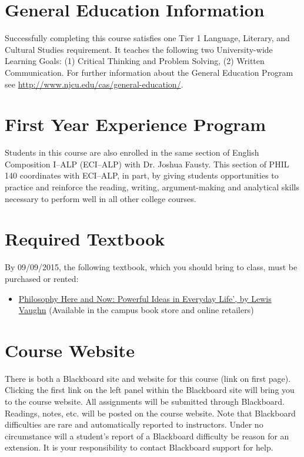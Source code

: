 \documentclass[article,oneside]{memoir}
\begin{document}
\section{General Education Information} 
Successfully completing this course satisfies one Tier 1 Language, Literary, and Cultural Studies requirement. It teaches the following two University-wide Learning Goals: (1) Critical Thinking and Problem Solving, (2) Written Communication. For further information about the General Education Program see \href{http://www.njcu.edu/cas/general-education/}{http://www.njcu.edu/cas/general-education/}.
 \section{First Year Experience Program}
Students in this course are also enrolled in the same section of English Composition I--ALP (ECI--ALP) with Dr. Joshua Fausty.  This section of PHIL 140 coordinates with ECI--ALP, in part, by giving students opportunities to practice and reinforce the reading, writing, argument-making and analytical skills necessary to perform well in all other college courses. 


\section{Required Textbook}

By 09/09/2015, the following textbook,  which you should bring to class, must be purchased or rented:

\begin{itemize}
\item
  \href{http://www.amazon.com/Philosophy-Here-Now-Powerful-Everyday/dp/0199765227}{Philosophy
  Here and Now: Powerful Ideas in Everyday Life', by Lewis Vaughn}
  (Available in the campus book store and online retailers)
\end{itemize}

\section{Course Website}
There is both a Blackboard site and website for this course (link on first page). Clicking the first link on the left panel within the Blackboard site will bring you to the course website. All assignments will be submitted through Blackboard. Readings, notes, etc. will be posted on the course website. Note that Blackboard difficulties are rare and automatically reported to instructors. Under no circumstance will a student's report of a Blackboard difficulty be reason for an extension. It is your responsibility to contact Blackboard support for help.
\end{document}
